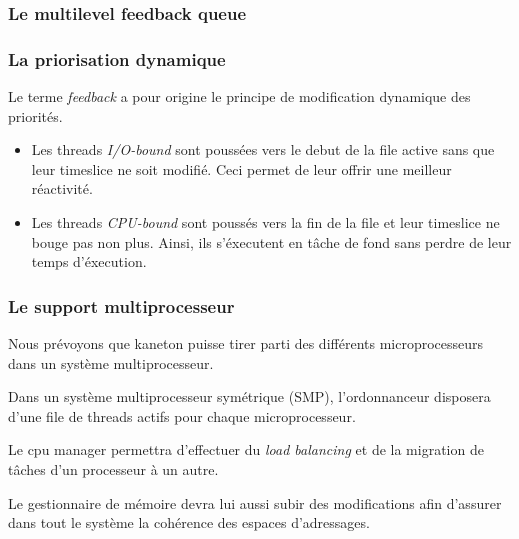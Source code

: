
\begin{frame}
  \frametitle{Le multilevel feedback queue}

  \begin{center}
  \end{center}
\end{frame}


\begin{frame}
  \frametitle{La priorisation dynamique}

  Le terme \emph{feedback} a pour origine le principe de
  modification dynamique des priorit\'{e}s.

  \begin{itemize}
  \item
    Les threads \emph{I/O-bound} sont pouss\'{e}es vers le debut de la
    file active sans que leur timeslice ne soit modifi\'{e}. Ceci permet
    de leur offrir une meilleur r\'{e}activit\'{e}.
  \item
    Les threads \emph{CPU-bound} sont pouss\'{e}s vers la fin de la file
    et leur timeslice ne bouge pas non plus. Ainsi, ils s'\'{e}xecutent en
    t\^ache de fond sans perdre de leur temps d'\'{e}xecution.
  \end{itemize}

\end{frame}


\begin{frame}
  \frametitle{Le support multiprocesseur}

  Nous pr\'{e}voyons que kaneton puisse tirer parti des diff\'{e}rents
  microprocesseurs dans un syst\`{e}me multiprocesseur.

  \-

  Dans un syst\`{e}me multiprocesseur sym\'{e}trique (SMP),
  l'ordonnanceur disposera d'une file de threads actifs pour chaque
  microprocesseur.

  Le cpu manager permettra d'effectuer du \emph{load balancing} et de
  la migration de t\^{a}ches d'un processeur \`{a} un autre.

  \-

  Le gestionnaire de m\'{e}moire devra lui aussi subir des
  modifications afin d'assurer dans tout le syst\`{e}me la
  coh\'{e}rence des espaces d'adressages.

\end{frame}


